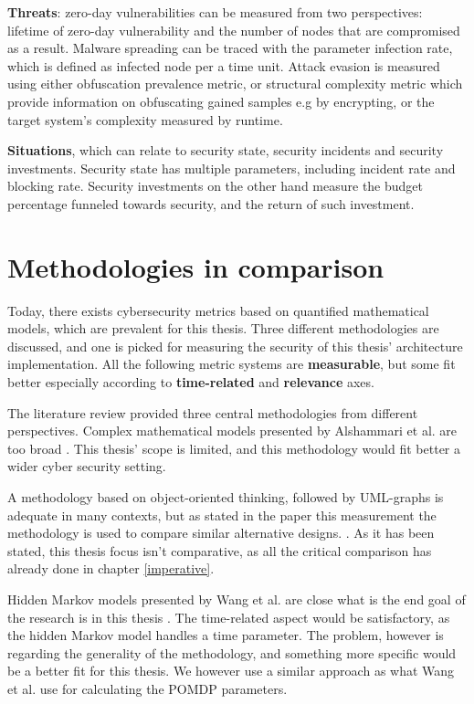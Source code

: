 \textbf{Threats}: zero-day vulnerabilities can be measured from two
perspectives: lifetime of zero-day vulnerability and the number of
nodes that are compromised as a result. Malware spreading can be
traced with the parameter infection rate, which is defined as infected
node per a time unit. Attack evasion is measured using either
obfuscation prevalence metric, or structural complexity metric which
provide information on obfuscating gained samples e.g by encrypting,
or the target system's complexity measured by
runtime. \cite{pendleton2016survey, ramos2017model}

\textbf{Situations}, which can relate to security state, security
incidents and security investments. Security state has multiple
parameters, including incident rate and blocking rate. Security
investments on the other hand measure the budget percentage funneled
towards security, and the return of such
investment. \cite{pendleton2016survey}

\section{Methodologies in comparison} \label{whyqueries}

Today, there exists cybersecurity metrics based on quantified
mathematical models, which are prevalent for this thesis. Three
different methodologies are discussed, and one is picked for measuring
the security of this thesis' architecture implementation. All the following metric
systems are \textbf{measurable}, but some fit better especially
according to \textbf{time-related} and \textbf{relevance} axes.

The literature review provided three central methodologies from different perspectives. Complex mathematical models
presented by Alshammari et al. are too broad
\cite{alshammari2009security}. This thesis' scope is limited, and this
methodology would fit better a wider cyber security setting.

A methodology based on object-oriented thinking, followed by
UML-graphs is adequate in many contexts, but as stated in the paper
this measurement the methodology is used to compare similar
alternative designs. \cite{alshammari2009security}. As it has been
stated, this thesis focus isn't comparative, as all the critical
comparison has already done in chapter \ref{imperative}.

Hidden Markov models presented by Wang et al. are close what is the
end goal of the research is in this thesis
\cite{wang2010framework}. The time-related aspect would be
satisfactory, as the hidden Markov model handles a time
parameter. The problem, however is regarding the generality of the
methodology, and something more specific would be a better
fit for this thesis. We however use a similar approach as what Wang et
al. use for calculating the POMDP parameters.

